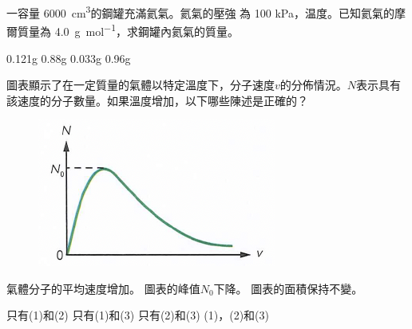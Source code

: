 {
    一容量 \qty{6000}{cm^3}的鋼罐充滿氦氣。氦氣的壓強 為 100 kPa，温度。已知氦氣的摩爾質量為 \qty{4.0}{g.mol^{-1}}，求鋼罐內氦氣的質量。
    \begin{choices}
        \choice 0.121g
        \choice  0.88g
        \choice 0.033g
        \CorrectChoice 0.96g
    \end{choices}
}{}

{
    圖表顯示了在一定質量的氣體以特定溫度下，分子速度$v$的分佈情況。$N$表示具有該速度的分子數量。如果溫度增加，以下哪些陳述是正確的？
    \begin{figure}[h!]
        \centering
        \includegraphics[width=.3\textwidth]{assets/8a0dd58e.png}
    \end{figure}
    \begin{statements}
        \task 氣體分子的平均速度增加。
        \task 圖表的峰值$N_0$下降。
        \task 圖表的面積保持不變。
    \end{statements}

    \begin{choices}
        \choice 只有(1)和(2)
        \choice 只有(1)和(3)
        \choice 只有(2)和(3)
        \CorrectChoice (1)，(2)和(3)
    \end{choices}
}{}

